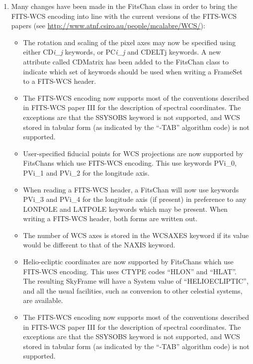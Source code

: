 \documentclass[twoside,11pt]{starlink}
\begin{document}
\begin{enumerate}

\item Many changes have been made in the FitsChan class in order to bring
the FITS-WCS encoding into line with the current versions of the FITS-WCS
papers (see
\url{http://www.atnf.csiro.au/people/mcalabre/WCS/}):

\begin{itemize}

\item The rotation and scaling of the pixel axes may now be specified using
either CD\emph{i\_j} keywords, or PC\emph{i\_j} and CDELTj keywords. A new attribute
called CDMatrix has been added to the FitsChan class to indicate which
set of keywords should be used when writing a FrameSet to a FITS-WCS
header.

\item The FITS-WCS encoding now supports most of the conventions
described in FITS-WCS paper III for the description of spectral
coordinates. The exceptions are that the SSYSOBS keyword is not
supported, and WCS stored in tabular form (as indicated by the ``-TAB''
algorithm code) is not supported.


\item User-specified fiducial points for WCS projections are now
supported by FitsChans which use FITS-WCS encoding. This use keywords
PVi\_0, PVi\_1 and PVi\_2 for the longitude axis.

\item  When reading a FITS-WCS header, a FitsChan will now use keywords PVi\_3
and PVi\_4 for the longitude axis (if present) in preference to any LONPOLE
and LATPOLE keywords which may be present. When writing a FITS-WCS header,
both forms are written out.

\item The number of WCS axes is stored in the WCSAXES keyword if its value
would be different to that of the NAXIS keyword.

\item Helio-ecliptic coordinates are now supported by FitsChans which use
FITS-WCS encoding. This uses CTYPE codes ``HLON'' and ``HLAT''. The
resulting SkyFrame will have a System value of ``HELIOECLIPTIC'', and all
the usual facilities, such as conversion to other celestial systems, are
available.

\item The FITS-WCS encoding now supports most of the conventions
described in FITS-WCS paper III for the description of spectral
coordinates. The exceptions are that the SSYSOBS keyword is not
supported, and WCS stored in tabular form (as indicated by the ``-TAB''
algorithm code) is not supported.


\end{itemize}
\end{enumerate}
\end{document}
